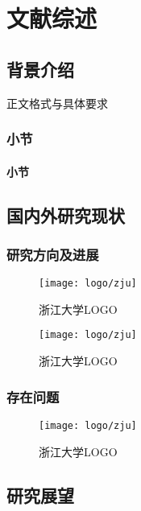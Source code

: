 \cleardoublepage
\newrefsection
\chapter{文献综述}

\section{背景介绍}
\par 正文格式与具体要求\cite{zjuthesisrules}

\subsection{小节}

\subsubsection{小节}

\section{国内外研究现状}

\subsection{研究方向及进展}

\begin{figure}[H]
    \centering
    \texttt{[image: logo/zju]}
    \caption{\label{fig:zju-logo}浙江大学LOGO}
\end{figure}

\begin{figure}[H]
    \centering
    \texttt{[image: logo/zju]}
    \caption{\label{fig:zju-logo1}浙江大学LOGO}
\end{figure}

\subsection{存在问题}

\begin{figure}[H]
    \centering
    \texttt{[image: logo/zju]}
    \caption{\label{fig:zju-logo2}浙江大学LOGO}
\end{figure}

\section{研究展望}

\newpage
\begingroup
    \printbibliography[title={参考文献}]
\endgroup
